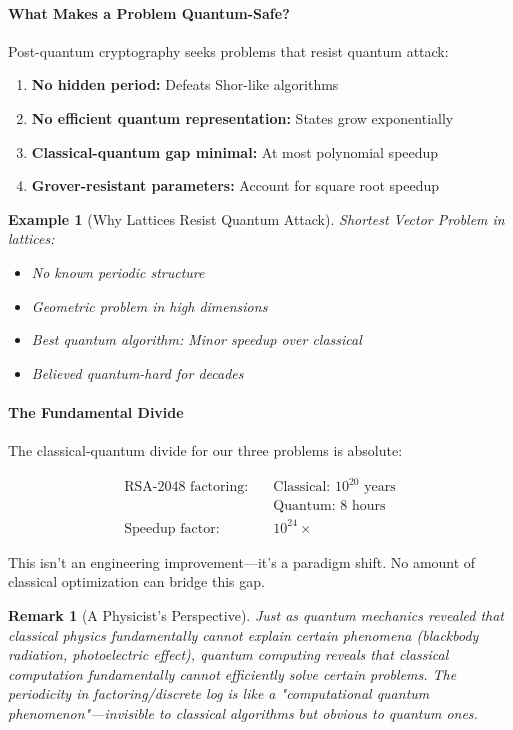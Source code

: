 \documentclass[11pt,a4paper]{article}
\newtheorem{example}{Example}
\newtheorem{remark}{Remark}
\begin{document}
\paragraph{What Makes a Problem Quantum-Safe?}

Post-quantum cryptography seeks problems that resist quantum attack:

\begin{enumerate}
    \item \textbf{No hidden period:} Defeats Shor-like algorithms
    \item \textbf{No efficient quantum representation:} States grow exponentially
    \item \textbf{Classical-quantum gap minimal:} At most polynomial speedup
    \item \textbf{Grover-resistant parameters:} Account for square root speedup
\end{enumerate}

\begin{example}[Why Lattices Resist Quantum Attack]
Shortest Vector Problem in lattices:
\begin{itemize}
    \item No known periodic structure
    \item Geometric problem in high dimensions
    \item Best quantum algorithm: Minor speedup over classical
    \item Believed quantum-hard for decades
\end{itemize}
\end{example}

\paragraph{The Fundamental Divide}

The classical-quantum divide for our three problems is absolute:

\begin{align}
\text{RSA-2048 factoring:} \quad &\text{Classical: } 10^{20} \text{ years}\\
&\text{Quantum: } 8 \text{ hours}\\
\text{Speedup factor:} \quad &10^{24} \times
\end{align}

This isn't an engineering improvement---it's a paradigm shift. No amount of classical optimization can bridge this gap.

\begin{remark}[A Physicist's Perspective]
Just as quantum mechanics revealed that classical physics fundamentally cannot explain certain phenomena (blackbody radiation, photoelectric effect), quantum computing reveals that classical computation fundamentally cannot efficiently solve certain problems. The periodicity in factoring/discrete log is like a "computational quantum phenomenon"---invisible to classical algorithms but obvious to quantum ones.
\end{remark}
\end{document}
